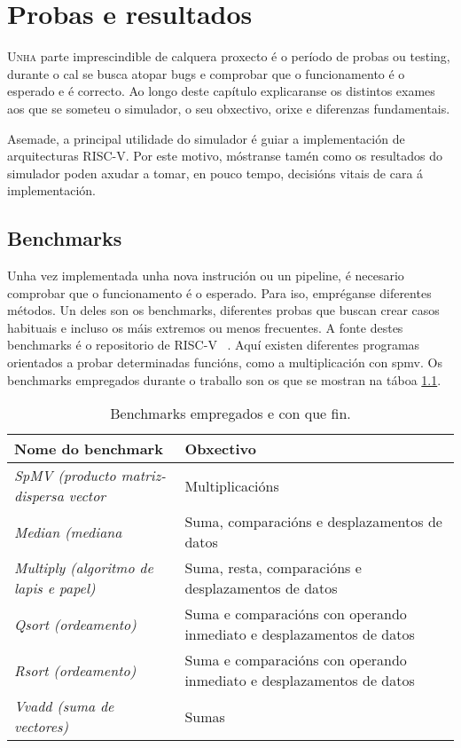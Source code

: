 \chapter{Probas e resultados}

\lettrine{U}{nha} parte imprescindible de calquera proxecto é o período de probas ou testing, durante o cal se busca atopar bugs e comprobar que o funcionamento é o esperado e é correcto. Ao longo deste capítulo explicaranse os distintos exames aos que se someteu o simulador, o seu obxectivo, orixe e diferenzas fundamentais.

Asemade, a principal utilidade do simulador é guiar a implementación de arquitecturas RISC-V. Por este motivo, móstranse tamén como os resultados do simulador poden axudar a tomar, en pouco tempo, decisións vitais de cara á implementación. 

\section{Benchmarks}\label{sec:benchmarks}
Unha vez implementada unha nova instrución ou un pipeline, é necesario comprobar que o funcionamento é o esperado. Para iso, empréganse diferentes métodos. Un deles son os benchmarks, diferentes probas que buscan crear casos habituais e incluso os máis extremos ou menos frecuentes. A fonte destes benchmarks é o repositorio de RISC-V ~\cite{riscv_tests}. Aquí existen diferentes programas orientados a probar determinadas funcións, como a multiplicación con \acrfull{spmv}. Os benchmarks empregados durante o traballo son os que se mostran na táboa \ref{tab:benchmarks}.
\begin{table}[hp!]
  \centering
  \begin{tabular}{p{5cm}|p{8cm}}
    \rowcolor{udcpink!25}
    \textbf{Nome do benchmark} & \textbf{Obxectivo} \\\hline
    \textit{SpMV (producto matriz-dispersa vector} & Multiplicacións \\
    \textit{Median (mediana } & Suma, comparacións e desplazamentos de datos \\
    \textit{Multiply (algoritmo de lapis e papel)} & Suma, resta, comparacións e desplazamentos de datos \\
    \textit{Qsort (ordeamento)} & Suma e comparacións con operando inmediato e desplazamentos de datos \\
    \textit{Rsort (ordeamento)} & Suma e comparacións con operando inmediato e desplazamentos de datos \\
    \textit{Vvadd (suma de vectores)} & Sumas\\
  \end{tabular}
  \caption{Benchmarks empregados e con que fin.}
  \label{tab:benchmarks}
\end{table}

